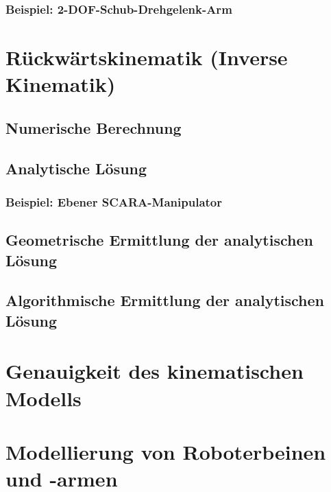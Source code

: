 \documentclass[a4paper, 11pt, accentcolor = tud3b]{tudreport}
\begin{document}
				\subsubsection{Beispiel: 2-DOF-Schub-Drehgelenk-Arm} %

		\section{Rückwärtskinematik (Inverse Kinematik)} %

			\subsection{Numerische Berechnung} %

			\subsection{Analytische Lösung} %

				\subsubsection{Beispiel: Ebener SCARA-Manipulator} %

			\subsection{Geometrische Ermittlung der analytischen Lösung} %

			\subsection{Algorithmische Ermittlung der analytischen Lösung} %

		\section{Genauigkeit des kinematischen Modells} %

		\section{Modellierung von Roboterbeinen und -armen} %
\end{document}

